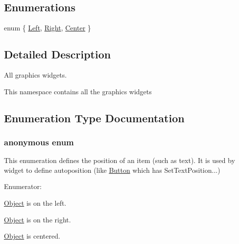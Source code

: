 \subsection*{Enumerations}
\begin{CompactItemize}
\item 
enum \{ \hyperlink{namespacesfgui_ed969f0aaa542b462035e828757f431328ce9405120beac8fae51bc232aeabec}{Left}, 
\hyperlink{namespacesfgui_ed969f0aaa542b462035e828757f4313d4fbbcf5a5a40412eeb0175f82c85b3f}{Right}, 
\hyperlink{namespacesfgui_ed969f0aaa542b462035e828757f43130172869b534ad2378e28e388342699cc}{Center}
 \}
\end{CompactItemize}


\subsection{Detailed Description}
All graphics widgets. 

This namespace contains all the graphics widgets 

\subsection{Enumeration Type Documentation}
\hypertarget{namespacesfgui_ed969f0aaa542b462035e828757f4313}{
\subsubsection["@0]{\setlength{\rightskip}{0pt plus 5cm}anonymous enum}}
\label{namespacesfgui_ed969f0aaa542b462035e828757f4313}


This enumeration defines the position of an item (such as text). It is used by widget to define autoposition (like \hyperlink{classsfgui_1_1Button}{Button} which has SetTextPosition...) \begin{Desc}
\item[Enumerator: ]\par
\begin{description}
\item[{\em 
\hypertarget{namespacesfgui_ed969f0aaa542b462035e828757f431328ce9405120beac8fae51bc232aeabec}{
Left}
\label{namespacesfgui_ed969f0aaa542b462035e828757f431328ce9405120beac8fae51bc232aeabec}
}]\hyperlink{classsfgui_1_1Object}{Object} is on the left. \item[{\em 
\hypertarget{namespacesfgui_ed969f0aaa542b462035e828757f4313d4fbbcf5a5a40412eeb0175f82c85b3f}{
Right}
\label{namespacesfgui_ed969f0aaa542b462035e828757f4313d4fbbcf5a5a40412eeb0175f82c85b3f}
}]\hyperlink{classsfgui_1_1Object}{Object} is on the right. \item[{\em 
\hypertarget{namespacesfgui_ed969f0aaa542b462035e828757f43130172869b534ad2378e28e388342699cc}{
Center}
\label{namespacesfgui_ed969f0aaa542b462035e828757f43130172869b534ad2378e28e388342699cc}
}]\hyperlink{classsfgui_1_1Object}{Object} is centered. \end{description}
\end{Desc}

